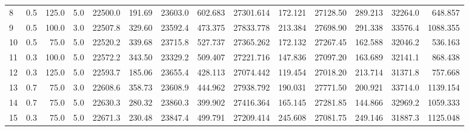 \begin{tabular}{lrrrrrrrrrrrrr}
8  & 0.5    & 125.0 & 5.0     & 22500.0                                          & 191.69                         & 23603.0                           & 602.683                          & 27301.614 & 172.121 & 27128.50 & 289.213 & 32264.0 & 648.857 \\
9  & 0.5    & 100.0 & 3.0     & 22507.8                                          & 329.60                         & 23592.4                           & 473.375                          & 27833.778 & 213.384 & 27698.90 & 291.338 & 33576.4 & 1088.355 \\
10  & 0.5    & 75.0  & 5.0     & 22520.2                                          & 339.68                         & 23715.8                           & 527.737                          & 27365.262 & 172.132 & 27267.45 & 162.588 & 32046.2 & 536.163 \\
11 & 0.3    & 100.0 & 5.0     & 22572.2                                          & 343.50                         & 23329.2                           & 509.407                          & 27221.716 & 147.836 & 27097.20 & 163.689 & 32141.1 & 868.438 \\
12 & 0.3    & 125.0 & 5.0     & 22593.7                                          & 185.06                         & 23655.4                           & 428.113                          & 27074.442 & 119.454 & 27018.20 & 213.714 & 31371.8 & 757.668 \\
13 & 0.7    & 75.0  & 3.0     & 22608.6                                          & 358.73                         & 23608.9                           & 444.962                          & 27938.792 & 190.031 & 27771.50 & 200.921 & 33714.0 & 1139.154 \\
14 & 0.7    & 75.0  & 5.0     & 22630.3                                          & 280.32                         & 23860.3                           & 399.902                          & 27416.364 & 165.145 & 27281.85 & 144.866 & 32969.2 & 1059.333 \\
15 & 0.3    & 75.0  & 5.0     & 22671.3                                          & 230.48                         & 23847.4                           & 499.791                          & 27209.414 & 245.608 & 27081.75 & 249.146 & 31887.3 & 1125.048 \\
\bottomrule
\end{tabular}
